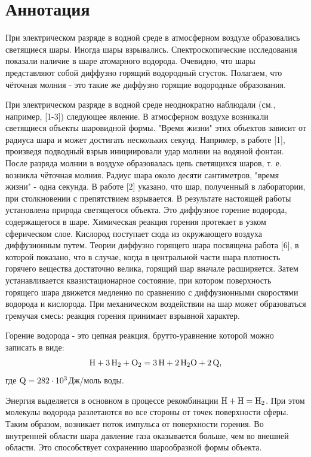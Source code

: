 \documentclass[a4paper]{article}
\begin{document}
\newpage
\section{Аннотация}

При электрическом разряде в водной среде в атмосферном воздухе образовались светящиеся шары. Иногда шары взрывались. Спектроскопические исследования показали наличие в шаре атомарного водорода. Очевидно, что шары представляют собой диффузно горящий водородный сгусток. Полагаем, что чёточная молния - это такие же диффузно горящие водородные образования.

При электрическом разряде в водной среде неоднократно наблюдали (см., например, [1-3]) следующее явление. В атмосферном воздухе возникали светящиеся объекты шаровидной формы. "Время жизни" этих объектов зависит от радиуса шара и может достигать нескольких секунд. Например, в работе [1], произведя подводный взрыв инициировали удар молнии на водяной фонтан. После разряда молнии в воздухе образовалась цепь светящихся шаров, т. е. возникла чёточная молния. Радиус шара около десяти сантиметров, "время жизни" - одна секунда. В работе [2] указано, что шар, полученный в лаборатории, при столкновении с препятствием взрывается. В результате настоящей работы установлена природа светящегося объекта. Это диффузное горение водорода, содержащегося в шаре. Химическая реакция горения протекает в узком сферическом слое. Кислород поступает сюда из окружающего воздуха диффузионным путем. Теории диффузно горящего шара посвящена работа [6], в которой показано, что в случае, когда в центральной части шара плотность горячего вещества достаточно велика, горящий шар вначале расширяется. Затем устанавливается квазистационарное состояние, при котором поверхность горящего шара движется медленно по сравнению с диффузионными скоростями водорода и кислорода. При механическом воздействии на шар может образоваться гремучая смесь: реакция горения принимает взрывной характер.

Горение водорода - это цепная реакция, брутто-уравнение которой можно записать в виде:
\begin{equation} \label{eq:1}
\ce{H} + \ce{3H2} + \ce{O2} = \ce{3H} + \ce{2H2O} + \ce{2Q},    
\end{equation}
где \(\ce{Q} = 282\cdot10^3\)Дж/моль воды.

Энергия выделяется в основном в процессе рекомбинации \(\ce{H} + \ce{H} = \ce{H2}\). При этом молекулы водорода разлетаются во все стороны от точек поверхности сферы. Таким образом, возникает поток импульса от поверхности горения. Во внутренней области шара давление газа оказывается больше, чем во внешней области. Это способствует сохранению шарообразной формы объекта. 
\end{document}

